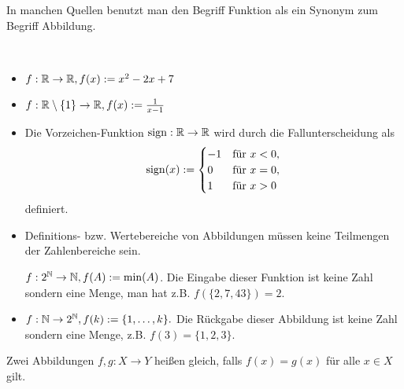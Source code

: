 \begin{bem} 
In manchen Quellen benutzt man den Begriff Funktion als ein Synonym zum Begriff Abbildung. 
\end{bem} 

%

\begin{bsp}\ 
\begin{itemize}
	\item $ f : \mathbb{R} \to \mathbb{R},\\ f(x) := x^2 -2x + 7 $
	\item $ f : \mathbb{R} \setminus \{ 1 \} \to \mathbb{R},\\ f(x) := \frac{1}{x-1}$
	\item Die Vorzeichen-Funktion $ \operatorname{sign}: \mathbb{R} \to \mathbb{R} $ wird durch die Fallunterscheidung als 
	\[
		\operatorname{sign}(x) := \begin{cases} 
				-1 &  \text{für} \ x < 0,
				\\ 0 & \text{für} \ x =0,
				\\ 1 & \text{für}  \ x >0
			\end{cases} 
	\]
	definiert. 
	\item Definitions- bzw. Wertebereiche von Abbildungen müssen keine Teilmengen der Zahlenbereiche sein. 
	
	$ f : 2^{\mathbb{N}} \to \mathbb{N}, f(A) := \min(A) $. Die Eingabe dieser Funktion ist keine Zahl sondern eine Menge, man hat z.B. $ f( \{ 2,7,43 \} ) = 2 $.
	\item $ f : \mathbb{N} \to 2^{\mathbb{N}}, f(k) := \{ 1,\ldots,k \}.$ Die Rückgabe dieser Abbildung ist keine Zahl sondern eine Menge, z.B. $f(3) = \{1,2,3\}$. 
\end{itemize}
\end{bsp} 

\begin{bem}
Zwei Abbildungen $ f,g : X \to Y $ heißen gleich, falls $ f(x) = g(x) $ für alle $ x \in X $ gilt. 
\end{bem} 

